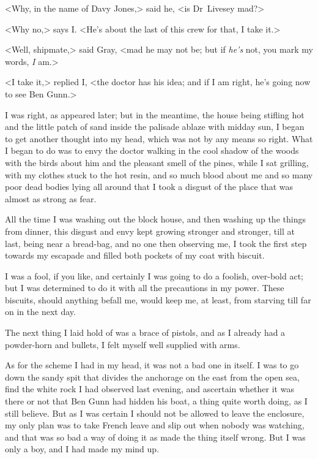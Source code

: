 <Why, in the name of Davy Jones,> said he, <is Dr~Livesey mad?>

<Why no,> says I\@. <He's about the last of this crew for that, I take it.>

<Well, shipmate,> said Gray, <mad he may not be; but if \textit{he's} not, you mark my words, \textit{I} am.>

<I take it,> replied I, <the doctor has his idea; and if I am right, he's going now to see Ben Gunn.>

I was right, as appeared later; but in the meantime, the house being stifling hot and the little patch of sand inside the palisade ablaze with midday sun, I began to get another thought into my head, which was not by any means so right. What I began to do was to envy the doctor walking in the cool shadow of the woods with the birds about him and the pleasant smell of the pines, while I sat grilling, with my clothes stuck to the hot resin, and so much blood about me and so many poor dead bodies lying all around that I took a disgust of the place that was almost as strong as fear.

All the time I was washing out the block house, and then washing up the things from dinner, this disgust and envy kept growing stronger and stronger, till at last, being near a bread-bag, and no one then observing me, I took the first step towards my escapade and filled both pockets of my coat with biscuit.

I was a fool, if you like, and certainly I was going to do a foolish, over-bold act; but I was determined to do it with all the precautions in my power. These biscuits, should anything befall me, would keep me, at least, from starving till far on in the next day.

The next thing I laid hold of was a brace of pistols, and as I already had a powder-horn and bullets, I felt myself well supplied with arms.

As for the scheme I had in my head, it was not a bad one in itself. I was to go down the sandy spit that divides the anchorage on the east from the open sea, find the white rock I had observed last evening, and ascertain whether it was there or not that Ben Gunn had hidden his boat, a thing quite worth doing, as I still believe. But as I was certain I should not be allowed to leave the enclosure, my only plan was to take French leave and slip out when nobody was watching, and that was so bad a way of doing it as made the thing itself wrong. But I was only a boy, and I had made my mind up.

